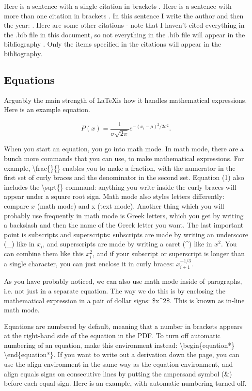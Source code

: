 \documentclass[11pt]{article}
\begin{document}
Here is a sentence with a single citation in brackets \parencite{Chan2015}. Here is a sentence with more than one citation in brackets \parencite{hfd2020,Clark2018}. In this sentence I write the author and then the year: \cite{wade2004}. Here are some other citations - note that I haven't cited everything in the .bib file in this document, so not everything in the .bib file will appear in the bibliography \parencite{stanphil,methmat2004,popprojections}. Only the items specified in the citations will appear in the bibliography.

\subsection{Equations}

Arguably the main strength of \LaTeX is how it handles mathematical expressions. Here is an example equation.

\begin{equation}
    P(x) = \frac{1}{\sigma \sqrt{2\pi}}e^{-(x_i -\mu)^2 / 2\sigma^2}.
\end{equation}

When you start an equation, you go into math mode. In math mode, there are a bunch more commands that you can use, to make mathematical expressions. For example, \textbackslash frac\{\}\{\} enables you to make a fraction, with the numerator in the first set of curly braces and the denominator in the second set. Equation (1) also includes the \textbackslash sqrt\{\} command: anything you write inside the curly braces will appear under a square root sign. Math mode also styles letters differently: compare $x$ (math mode) and x (text mode). Another thing which you will probably use frequently in math mode is Greek letters, which you get by writing a backslash and then the name of the Greek letter you want. The last important point is subscripts and superscripts: subscripts are made by writing an underscore (\_) like in $x_i$, and superscripts are made by writing a caret (\^{}) like in $x^2$. You can combine them like this $x_i^2$, and if your subscript or superscript is longer than a single character, you can just enclose it in curly braces: $x_{i+1}^{-1/3}$.

As you have probably noticed, we can also use math mode inside of paragraphs, i.e. not just in a separate equation. The way we do this is by enclosing the mathematical expression in a pair of dollar signs: \$x\^{}2\$. This is known as in-line math mode.

Equations are numbered by default, meaning that a number in brackets appears at the right-hand side of the equation in the PDF. To turn off automatic numbering of an equation, make this environment instead: \textbackslash begin\{equation*\} \textbackslash end\{equation*\}. If you want to write out a derivation down the page, you can use the align environment in the same way as the equation environment, and align equals signs on consecutive lines by putting the ampersand symbol (\&) before each equal sign. Here is an example, with automatic numbering turned off.
\end{document}
